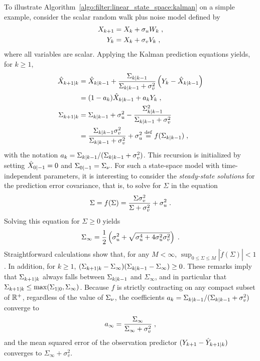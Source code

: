 \begin{ex} To illustrate Algorithm~\ref{algo:filter:linear_state_space:kalman} on a simple example, consider the scalar random walk plus noise model defined
  by
\begin{align*}
X_{k+1} &= X_k + \sigma_u W_k \;, \\
Y_k &= X_k + \sigma_v V_k \;,
\end{align*}
where all variables are scalar. Applying the Kalman prediction equations
yields, for $k \geq 1$,
\begin{align}
\label{eq:predicted-estimator-RW}
\hat{X}_{k+1|k}&= \hat{X}_{k|k-1} + \frac{\Sigma_{k|k-1}}{\Sigma_{k|k-1}+\sigma_v^2}\left( Y_k - \hat{X}_{k|k-1} \right) \\ \nonumber
                 &= (1-a_k) \hat{X}_{k|k-1} + a_k Y_k \; , \\
\label{eq:predicted-error-covariance-RW}
\Sigma_{k+1|k} &= \Sigma_{k|k-1} + \sigma_u^2 - \frac{\Sigma_{k|k-1}^2}{\Sigma_{k|k-1}+\sigma_v^2} \nonumber \\
                 &= \frac{\Sigma_{k|k-1} \sigma_v^2}{\Sigma_{k|k-1} + \sigma_v^2}  + \sigma_u^2 \stackrel{\mathrm{def}}{=} f(\Sigma_{k|k-1}) \; ,
\end{align}
with the notation $a_k = \Sigma_{k|k-1}/ (\Sigma_{k|k-1}+\sigma_v^2)$.
This recursion is initialized by setting $\hat{X}_{0|-1}= 0$ and
$\Sigma_{0|-1}= \Sigma_{\nu}$. For such a state-space model with time-independent parameters, it is interesting to consider the \emph{steady-state
  solutions} for the prediction error covariance,
that is, to solve for $\Sigma$ in the equation
$$
\Sigma = f(\Sigma) = \frac{\Sigma \sigma_v^2}{\Sigma + \sigma_v^2} +
\sigma_u^2 \; .
$$
Solving this equation for $\Sigma\geq 0$ yields
$$
\Sigma_\infty = \frac12 \left( \sigma_u^2 + \sqrt{\sigma_u^4 + 4 \sigma_u^2 \sigma_v^2}\right) \;.
$$
Straightforward calculations show that, for any $M < \infty$, $\sup_{0 \leq
  \Sigma \leq M} |\dot{f}(\Sigma)| < 1$. In addition, for $k \geq 1$,
$(\Sigma_{k+1|k} - \Sigma_\infty) (\Sigma_{k|k-1} - \Sigma_\infty) \geq 0$.
These remarks imply that $\Sigma_{k+1|k}$ always falls between
$\Sigma_{k|k-1}$ and $\Sigma_\infty$, and in particular that
$\Sigma_{k+1|k} \leq \max(\Sigma_{1|0},\Sigma_\infty)$.  Because $f$ is
strictly contracting on any compact subset of $\mathbb{R}^+$, regardless of the
value of $\Sigma_{\nu}$, the coefficients $a_k =
\Sigma_{k|k-1}/(\Sigma_{k|k-1}+\sigma_v^2)$ converge to
$$
  a_\infty = \frac{\Sigma_\infty}{\Sigma_\infty + \sigma_v^2} \; ,
$$
and the mean squared error of the observation predictor $(Y_{k+1} - \hat{Y}_{k+1|k})$ converges to $\Sigma_\infty+ \sigma_v^2$.
\end{ex}

